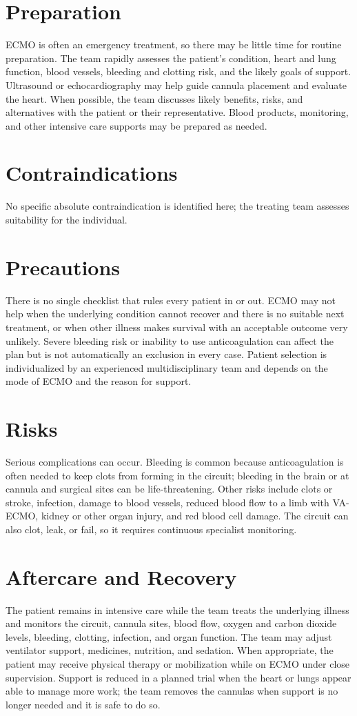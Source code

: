 \section*{Preparation}
ECMO is often an emergency treatment, so there may be little time for routine preparation. The team rapidly assesses the patient's condition, heart and lung function, blood vessels, bleeding and clotting risk, and the likely goals of support. Ultrasound or echocardiography may help guide cannula placement and evaluate the heart. When possible, the team discusses likely benefits, risks, and alternatives with the patient or their representative. Blood products, monitoring, and other intensive care supports may be prepared as needed.

\section*{Contraindications}
No specific absolute contraindication is identified here; the treating team assesses suitability for the individual.

\section*{Precautions}
There is no single checklist that rules every patient in or out. ECMO may not help when the underlying condition cannot recover and there is no suitable next treatment, or when other illness makes survival with an acceptable outcome very unlikely. Severe bleeding risk or inability to use anticoagulation can affect the plan but is not automatically an exclusion in every case. Patient selection is individualized by an experienced multidisciplinary team and depends on the mode of ECMO and the reason for support.

\section*{Risks}
Serious complications can occur. Bleeding is common because anticoagulation is often needed to keep clots from forming in the circuit; bleeding in the brain or at cannula and surgical sites can be life-threatening. Other risks include clots or stroke, infection, damage to blood vessels, reduced blood flow to a limb with VA-ECMO, kidney or other organ injury, and red blood cell damage. The circuit can also clot, leak, or fail, so it requires continuous specialist monitoring.

\section*{Aftercare and Recovery}
The patient remains in intensive care while the team treats the underlying illness and monitors the circuit, cannula sites, blood flow, oxygen and carbon dioxide levels, bleeding, clotting, infection, and organ function. The team may adjust ventilator support, medicines, nutrition, and sedation. When appropriate, the patient may receive physical therapy or mobilization while on ECMO under close supervision. Support is reduced in a planned trial when the heart or lungs appear able to manage more work; the team removes the cannulas when support is no longer needed and it is safe to do so.

